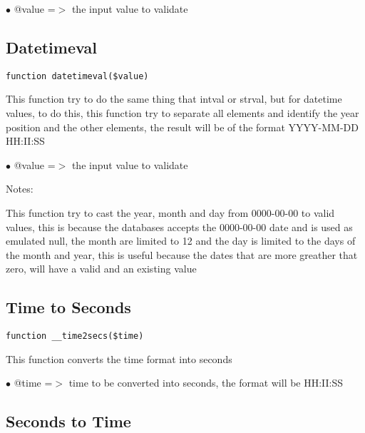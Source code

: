\documentclass[a4paper]{book}
\begin{document}
\begin{compactitem}
\item[\color{myblue}$\bullet$] @value =$>$ the input value to validate
\end{compactitem}

\hypertarget{toc82}{}
\subsection{Datetimeval}

\begin{lstlisting}
function datetimeval($value)
\end{lstlisting}

This function try to do the same thing that intval or strval, but for datetime
values, to do this, this function try to separate all elements and identify
the year position and the other elements, the result will be of the format
YYYY-MM-DD HH:II:SS

\begin{compactitem}
\item[\color{myblue}$\bullet$] @value =$>$ the input value to validate
\end{compactitem}

Notes:

This function try to cast the year, month and day from 0000-00-00 to valid
values, this is because the databases accepts the 0000-00-00 date and is used
as emulated null, the month are limited to 12 and the day is limited to the
days of the month and year, this is useful because the dates that are more
greather that zero, will have a valid and an existing value

\hypertarget{toc83}{}
\subsection{Time to Seconds}

\begin{lstlisting}
function __time2secs($time)
\end{lstlisting}

This function converts the time format into seconds

\begin{compactitem}
\item[\color{myblue}$\bullet$] @time =$>$ time to be converted into seconds, the format will be HH:II:SS
\end{compactitem}

\hypertarget{toc84}{}
\subsection{Seconds to Time}
\end{document}
